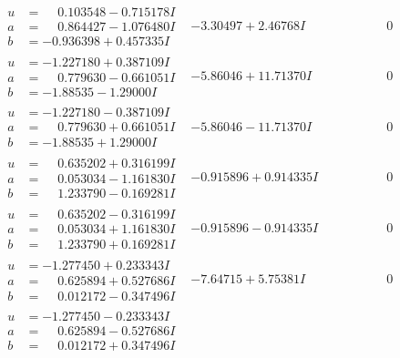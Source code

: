 \documentclass[1p]{elsarticle_modified}
\theoremstyle{definition}
\begin{document}
$$\begin{array}{c|c|c}
\begin{aligned}
u &= \phantom{-}0.103548 - 0.715178 I \\
a &= \phantom{-}0.864427 - 1.076480 I \\
b &= -0.936398 + 0.457335 I\end{aligned}
 & -3.30497 + 2.46768 I & \phantom{-0.000000 } 0 \\ \hline\begin{aligned}
u &= -1.227180 + 0.387109 I \\
a &= \phantom{-}0.779630 - 0.661051 I \\
b &= -1.88535 - 1.29000 I\end{aligned}
 & -5.86046 + 11.71370 I & \phantom{-0.000000 } 0 \\ \hline\begin{aligned}
u &= -1.227180 - 0.387109 I \\
a &= \phantom{-}0.779630 + 0.661051 I \\
b &= -1.88535 + 1.29000 I\end{aligned}
 & -5.86046 - 11.71370 I & \phantom{-0.000000 } 0 \\ \hline\begin{aligned}
u &= \phantom{-}0.635202 + 0.316199 I \\
a &= \phantom{-}0.053034 - 1.161830 I \\
b &= \phantom{-}1.233790 - 0.169281 I\end{aligned}
 & -0.915896 + 0.914335 I & \phantom{-0.000000 } 0 \\ \hline\begin{aligned}
u &= \phantom{-}0.635202 - 0.316199 I \\
a &= \phantom{-}0.053034 + 1.161830 I \\
b &= \phantom{-}1.233790 + 0.169281 I\end{aligned}
 & -0.915896 - 0.914335 I & \phantom{-0.000000 } 0 \\ \hline\begin{aligned}
u &= -1.277450 + 0.233343 I \\
a &= \phantom{-}0.625894 + 0.527686 I \\
b &= \phantom{-}0.012172 - 0.347496 I\end{aligned}
 & -7.64715 + 5.75381 I & \phantom{-0.000000 } 0 \\ \hline\begin{aligned}
u &= -1.277450 - 0.233343 I \\
a &= \phantom{-}0.625894 - 0.527686 I \\
b &= \phantom{-}0.012172 + 0.347496 I\end{aligned}

\end{array}$$
\end{document}
